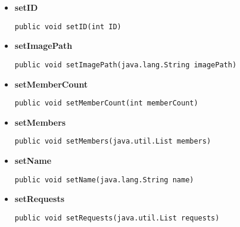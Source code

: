 \documentclass[11pt,a4paper]{report}
\begin{document}
{{{{{\begin{itemize}
{
\hypertarget{edu.kit.pse17.go_app.PersistenceLayer.GroupEntity.setDescription(java.lang.String)}{{\bf  setDescription}\\}
\begin{lstlisting}[frame=none]
public void setDescription(java.lang.String description)\end{lstlisting} %
}%
\item{ 
\hypertarget{edu.kit.pse17.go_app.PersistenceLayer.GroupEntity.setID(int)}{{\bf  setID}\\}
\begin{lstlisting}[frame=none]
public void setID(int ID)\end{lstlisting} %
}%
\item{ 
\hypertarget{edu.kit.pse17.go_app.PersistenceLayer.GroupEntity.setImagePath(java.lang.String)}{{\bf  setImagePath}\\}
\begin{lstlisting}[frame=none]
public void setImagePath(java.lang.String imagePath)\end{lstlisting} %
}%
\item{ 
\hypertarget{edu.kit.pse17.go_app.PersistenceLayer.GroupEntity.setMemberCount(int)}{{\bf  setMemberCount}\\}
\begin{lstlisting}[frame=none]
public void setMemberCount(int memberCount)\end{lstlisting} %
}%
\item{ 
\hypertarget{edu.kit.pse17.go_app.PersistenceLayer.GroupEntity.setMembers(java.util.List)}{{\bf  setMembers}\\}
\begin{lstlisting}[frame=none]
public void setMembers(java.util.List members)\end{lstlisting} %
}%
\item{ 
\hypertarget{edu.kit.pse17.go_app.PersistenceLayer.GroupEntity.setName(java.lang.String)}{{\bf  setName}\\}
\begin{lstlisting}[frame=none]
public void setName(java.lang.String name)\end{lstlisting} %
}%
\item{ 
\hypertarget{edu.kit.pse17.go_app.PersistenceLayer.GroupEntity.setRequests(java.util.List)}{{\bf  setRequests}\\}
\begin{lstlisting}[frame=none]
public void setRequests(java.util.List requests)\end{lstlisting} %
}%
\end{itemize}
}
}
}}}
\end{document}
